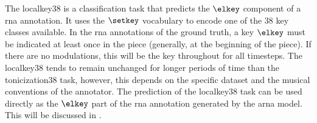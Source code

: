 
The \gls{localkey38} is a classification task that predicts
the $\elkey$ component of a \gls{rna} annotation. It uses
the $\setkey$ vocabulary to encode one of the 38 key classes
available. In the \gls{rna} annotations of the ground truth,
a key $\elkey$ must be indicated at least once in the piece
(generally, at the beginning of the piece). If there are no
modulations, this will be the key throughout for all
timesteps. The \gls{localkey38} tends to remain unchanged
for longer periods of time than the \gls{tonicization38}
task, however, this depends on the specific dataset and the
musical conventions of the annotator. The prediction of the
\gls{localkey38} task can be used directly as the $\elkey$
part of the \gls{rna} annotation generated by the \gls{arna}
model. This will be discussed in .



